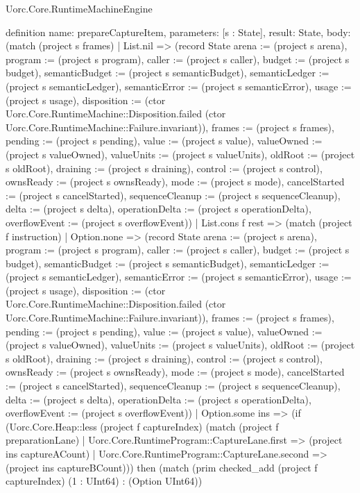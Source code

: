 \begin{lexlean}{Uorc.Core.RuntimeMachineEngine}
\begin{semanticmodule}
definition{
  name: prepareCaptureItem,
  parameters: [s : State],
  result: State,
  body: (match (project s frames)
    | List.nil => (record State {arena := (project s arena), program := (project s program), caller := (project s caller), budget := (project s budget), semanticBudget := (project s semanticBudget), semanticLedger := (project s semanticLedger), semanticError := (project s semanticError), usage := (project s usage), disposition := (ctor Uorc.Core.RuntimeMachine::Disposition.failed (ctor Uorc.Core.RuntimeMachine::Failure.invariant)), frames := (project s frames), pending := (project s pending), value := (project s value), valueOwned := (project s valueOwned), valueUnits := (project s valueUnits), oldRoot := (project s oldRoot), draining := (project s draining), control := (project s control), ownsReady := (project s ownsReady), mode := (project s mode), cancelStarted := (project s cancelStarted), sequenceCleanup := (project s sequenceCleanup), delta := (project s delta), operationDelta := (project s operationDelta), overflowEvent := (project s overflowEvent)})
    | List.cons f rest => (match (project f instruction)
      | Option.none => (record State {arena := (project s arena), program := (project s program), caller := (project s caller), budget := (project s budget), semanticBudget := (project s semanticBudget), semanticLedger := (project s semanticLedger), semanticError := (project s semanticError), usage := (project s usage), disposition := (ctor Uorc.Core.RuntimeMachine::Disposition.failed (ctor Uorc.Core.RuntimeMachine::Failure.invariant)), frames := (project s frames), pending := (project s pending), value := (project s value), valueOwned := (project s valueOwned), valueUnits := (project s valueUnits), oldRoot := (project s oldRoot), draining := (project s draining), control := (project s control), ownsReady := (project s ownsReady), mode := (project s mode), cancelStarted := (project s cancelStarted), sequenceCleanup := (project s sequenceCleanup), delta := (project s delta), operationDelta := (project s operationDelta), overflowEvent := (project s overflowEvent)})
      | Option.some ins => (if (Uorc.Core.Heap::less (project f captureIndex) (match (project f preparationLane)
        | Uorc.Core.RuntimeProgram::CaptureLane.first => (project ins captureACount)
        | Uorc.Core.RuntimeProgram::CaptureLane.second => (project ins captureBCount))) then (match (prim checked_add (project f captureIndex) (1 : UInt64) : (Option UInt64))
}
\end{semanticmodule}
\end{lexlean}
